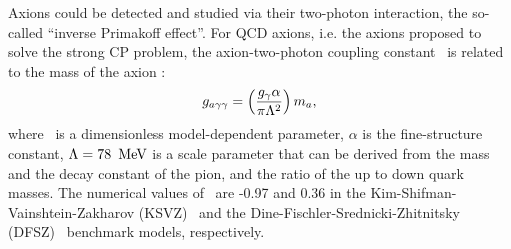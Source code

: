 Axions could be detected and studied via their two-photon interaction, the
so-called ``inverse Primakoff effect''. For QCD axions, i.e. the axions 
proposed to solve the strong CP problem, the axion-two-photon coupling 
constant \bgagg\ is related to the mass of the axion \ma: 
\begin{equation}
 g_{a\gamma\gamma} = \left(\frac{g_{\gamma}\alpha}{\pi \Lambda^2}\right)m_a, 
\label{eq:grelation}
\end{equation}
where \bggamma\ is a dimensionless model-dependent parameter, $\alpha$ is the 
fine-structure constant, $\Lambda=78~\,\text{Me\hspace{-.08em}V}$ is a scale parameter that can 
be derived from the mass and the decay constant of the pion, and the ratio of 
the up to down quark masses. 
The numerical values of \bggamma\ are -0.97 and 0.36 
in the Kim-Shifman-Vainshtein-Zakharov (KSVZ)~\cite{KSVZI,KSVZII} and 
the Dine-Fischler-Srednicki-Zhitnitsky (DFSZ)~\cite{DFSZI,DFSZII} benchmark 
models, respectively. 
%
%
% 

